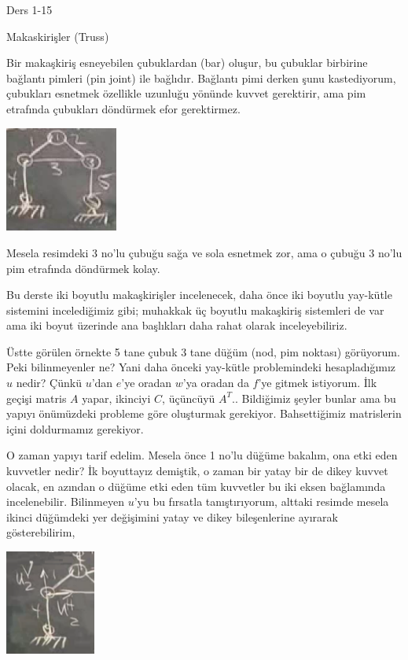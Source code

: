 \documentclass[12pt,fleqn]{article}\usepackage{../../common}
\begin{document}
Ders 1-15

Makaskirişler (Truss)

Bir makaşkiriş esneyebilen çubuklardan (bar) oluşur, bu çubuklar birbirine
bağlantı pimleri (pin joint) ile bağlıdır. Bağlantı pimi derken şunu
kastediyorum, çubukları esnetmek özellikle uzunluğu yönünde kuvvet gerektirir,
ama pim etrafında çubukları döndürmek efor gerektirmez.

\includegraphics[width=10em]{compscieng_1_15_01.png}

Mesela resimdeki 3 no'lu çubuğu sağa ve sola esnetmek zor, ama o çubuğu
3 no'lu pim etrafında döndürmek kolay.

Bu derste iki boyutlu makaşkirişler incelenecek, daha önce iki boyutlu yay-kütle
sistemini incelediğimiz gibi; muhakkak üç boyutlu makaşkiriş sistemleri de var
ama iki boyut üzerinde ana başlıkları daha rahat olarak inceleyebiliriz.

Üstte görülen örnekte 5 tane çubuk 3 tane düğüm (nod, pim noktası) görüyorum.
Peki bilinmeyenler ne? Yani daha önceki yay-kütle problemindeki hesapladığımız
$u$ nedir? Çünkü $u$'dan $e$'ye oradan $w$'ya oradan da $f$'ye gitmek
istiyorum. İlk geçişi matris $A$ yapar, ikinciyi $C$, üçüncüyü $A^T$..
Bildiğimiz şeyler bunlar ama bu yapıyı önümüzdeki probleme göre oluşturmak
gerekiyor. Bahsettiğimiz matrislerin içini doldurmamız gerekiyor.

O zaman yapıyı tarif edelim. Mesela önce 1 no'lu düğüme bakalım, ona etki eden
kuvvetler nedir? İk boyuttayız demiştik, o zaman bir yatay bir de dikey kuvvet
olacak, en azından o düğüme etki eden tüm kuvvetler bu iki eksen bağlamında
incelenebilir. Bilinmeyen $u$'yu bu fırsatla tanıştırıyorum, alttaki resimde
mesela ikinci düğümdeki yer değişimini yatay ve dikey bileşenlerine ayırarak
gösterebilirim,

\includegraphics[width=8em]{compscieng_1_15_02.png}
\end{document}
